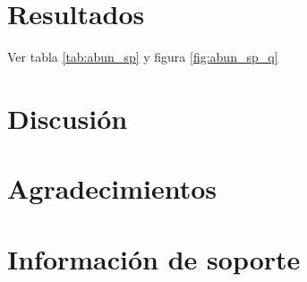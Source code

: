 \documentclass[11pt,]{article}
\begin{document}
\section{Resultados}\label{resultados}

Ver tabla \ref{tab:abun_sp} y figura \ref{fig:abun_sp_q}

\section{Discusión}\label{discusiuxf3n}

\section{Agradecimientos}\label{agradecimientos}

\section{Información de soporte}\label{informaciuxf3n-de-soporte}
\end{document}
